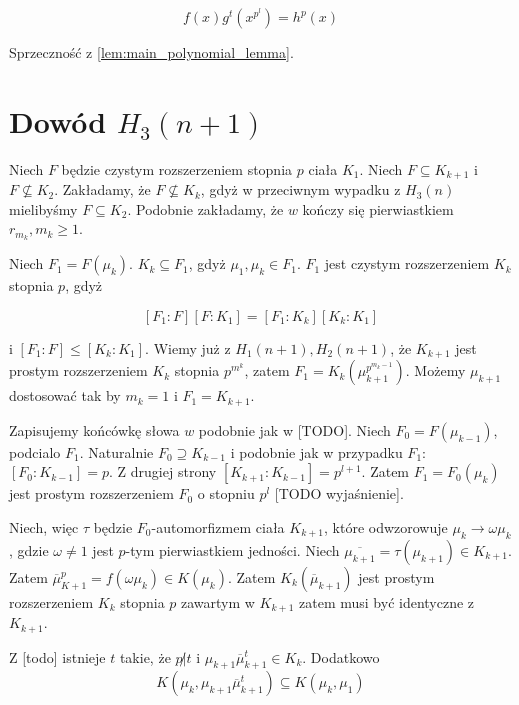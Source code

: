 \[f(x)g^t \left( x^{p^l} \right) = h^p(x)\]

Sprzeczność z \ref{lem:main_polynomial_lemma}.


\section{Dowód $H_3(n+1)$}
Niech $F$ będzie czystym rozszerzeniem stopnia $p$ ciała $K_1$. Niech $F
\subseteq K_{k+1}$ i $F \not \subseteq K_2$. Zakładamy, że $F \not \subseteq
K_k$, gdyż w przeciwnym wypadku z $H_3(n)$ mielibyśmy $F \subseteq K_2$.
Podobnie zakładamy, że $w$ kończy się pierwiastkiem $r_{m_k}, m_k \geq 1$.

Niech $F_1 = F \left( \mu_k \right)$. $K_k \subseteq F_1$, gdyż $\mu_1, \mu_k
\in F_1$. $F_1$ jest czystym rozszerzeniem $K_k$ stopnia $p$, gdyż

\[
\left[F_1:F\right]\left[F:K_1 \right] =
\left[F_1:K_k\right]\left[K_k:K_1\right]
\]

i $\left[F_1:F\right] \leq \left[K_k:K_1\right]$. Wiemy już z $H_1(n+1),
H_2(n+1)$, że $K_{k+1}$ jest prostym rozszerzeniem $K_k$ stopnia $p^{m^k}$,
zatem $F_1 = K_k \left(\mu_{k+1}^{p^{m_k -1}} \right)$. Możemy $\mu_{k+1}$
dostosować tak by $m_k = 1$ i $F_1 = K_{k+1}$.

Zapisujemy końcówkę słowa $w$ podobnie jak w [TODO]. Niech $F_0 = F \left(
\mu_{k-1} \right)$, podcialo $F_1$. Naturalnie $F_0 \supseteq K_{k-1}$ i
podobnie jak w przypadku $F_1$: $\left[F_0:K_{k-1} \right] = p$. Z drugiej
strony $\left[ K_{k+1} : K_{k-1} \right] = p^{l+1}$.
Zatem $F_1 = F_0 \left(\mu_k \right)$ jest prostym rozszerzeniem $F_0$ o stopniu
$p^l$ [TODO wyjaśnienie].

Niech, więc $\tau$ będzie $F_0$-automorfizmem ciała $K_{k+1}$, które odwzorowuje
$\mu_k \rightarrow \omega \mu_k$, gdzie $\omega \neq 1$ jest $p$-tym
pierwiastkiem jedności. Niech $\overline{\mu_{k+1}} = \tau \left( \mu_{k+1}
\right) \in K_{k+1}$. Zatem $\overline{\mu}_{K+1}^p = f \left( \omega \mu_k
\right) \in K \left( \mu_k \right)$.
Zatem $K_k \left(\overline{\mu}_{k+1} \right)$ jest prostym rozszerzeniem $K_k$
stopnia $p$ zawartym w $K_{k+1}$ zatem musi być identyczne z $K_{k+1}$.

Z [todo] istnieje $t$ takie, że $p \not | t$ i
$\mu_{k+1} \overline{\mu}_{k+1}^t \in K_k$. Dodatkowo
\[ K \left( \mu_k, \mu_{k+1} \overline{\mu}_{k+1}^t \right)
  \subseteq
  K \left( \mu_k, \mu_1 \right)
\]

